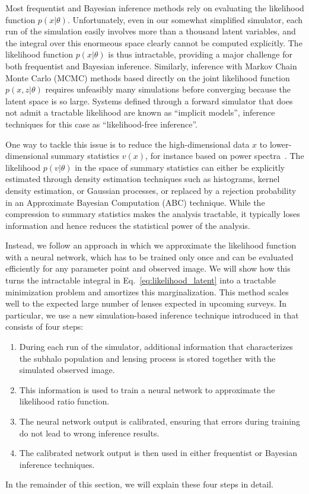 \documentclass[twocolumn]{aastex62}
\begin{document}
Most frequentist and Bayesian inference methods rely on evaluating the likelihood function $p(x|\theta)$. Unfortunately, even in our somewhat simplified simulator, each run of the simulation easily involves more than a thousand latent variables, and the integral over this enormeous space clearly cannot be computed explicitly. The likelihood function $p(x | \theta)$ is thus intractable, providing a major challenge for both frequentist and Bayesian inference. Similarly, inference with Markov Chain Monte Carlo (MCMC) methods based directly on the joint likelihood function $p(x,z | \theta)$ requires unfeasibly many simulations before converging because the latent space is so large. Systems defined through a forward simulator that does not admit a tractable likelihood are known as ``implicit models'', inference techniques for this case as ``likelihood-free inference''.

One way to tackle this issue is to reduce the high-dimensional data $x$ to lower-dimensional summary statistics $v(x)$, for instance based on power spectra~\citep{1403.2720,1809.00004,1707.04590,1806.07897,1808.03501,1710.03075,1506.01724}. The likelihood $p(v|\theta)$ in the space of summary statistics can either be explicitly estimated through density estimation techniques such as histograms, kernel density estimation, or Gaussian processes, or replaced by a rejection probability in an Approximate Bayesian Computation (ABC) technique. While the compression to summary statistics makes the analysis tractable, it typically loses information and hence reduces the statistical power of the analysis.

Instead, we follow an approach in which we approximate the likelihood function with a neural network, which has to be trained only once and can be evaluated efficiently for any parameter point and observed image. We will show how this turns the intractable integral in Eq.~\eqref{eq:likelihood_latent} into a tractable minimization problem and amortizes this marginalization. This method scales well to the expected large number of lenses expected in upcoming surveys.  In particular, we use a new simulation-based inference technique introduced in \cite{1805.00013,1805.00020,1805.12244} that consists of four steps:
%
\begin{enumerate}
  \item During each run of the simulator, additional information that characterizes the subhalo population and lensing process is stored together with the simulated observed image.
  \item This information is used to train a neural network to approximate the likelihood ratio function.
  \item The neural network output is calibrated, ensuring that errors during training do not lead to wrong inference results.
  \item The calibrated network output is then used in either frequentist or Bayesian inference techniques.
\end{enumerate}
%
In the remainder of this section, we will explain these four steps in detail.
\end{document}
